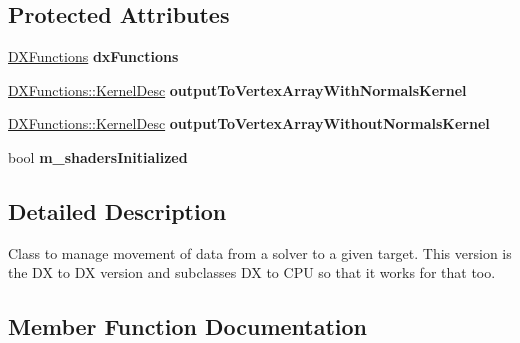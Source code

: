 \subsection*{Protected Attributes}
\begin{DoxyCompactItemize}
\item 
\mbox{\label{classbtSoftBodySolverOutputDXtoDX_a0e59a313f5c216a89c7db0e7a6e00bc9}} 
\hyperlink{classDXFunctions}{D\+X\+Functions} {\bfseries dx\+Functions}
\item 
\mbox{\label{classbtSoftBodySolverOutputDXtoDX_a520eda8045f9dd00760b53a651553a2d}} 
\hyperlink{classDXFunctions_1_1KernelDesc}{D\+X\+Functions\+::\+Kernel\+Desc} {\bfseries output\+To\+Vertex\+Array\+With\+Normals\+Kernel}
\item 
\mbox{\label{classbtSoftBodySolverOutputDXtoDX_a9eb099f1e0c4a54ab08481126473d73a}} 
\hyperlink{classDXFunctions_1_1KernelDesc}{D\+X\+Functions\+::\+Kernel\+Desc} {\bfseries output\+To\+Vertex\+Array\+Without\+Normals\+Kernel}
\item 
\mbox{\label{classbtSoftBodySolverOutputDXtoDX_a9fa048c485cdd386bab4eb32ac50ba7f}} 
bool {\bfseries m\+\_\+shaders\+Initialized}
\end{DoxyCompactItemize}


\subsection{Detailed Description}
Class to manage movement of data from a solver to a given target. This version is the DX to DX version and subclasses DX to C\+PU so that it works for that too. 

\subsection{Member Function Documentation}
\mbox{\label{classbtSoftBodySolverOutputDXtoDX_ab1bb3e5dd8a6e45ad6063398682806cb}} 
